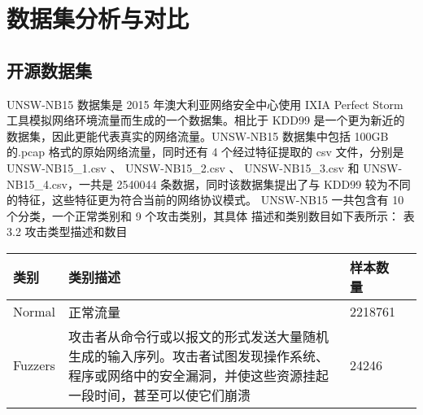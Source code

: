 \chapter{数据集分析与对比}
\section{开源数据集}
UNSW-NB15 数据集是 2015 年澳大利亚网络安全中心使用 IXIA Perfect Storm
工具模拟网络环境流量而生成的一个数据集。相比于 KDD99 是一个更为新近的
数据集，因此更能代表真实的网络流量。UNSW-NB15 数据集中包括 100GB
的.pcap 格式的原始网络流量，同时还有 4 个经过特征提取的 csv 文件，分别是
UNSW-NB15\_1.csv  、 UNSW-NB15\_2.csv 、 UNSW-NB15\_3.csv  和   UNSW-
NB15\_4.csv，一共是 2540044 条数据，同时该数据集提出了与 KDD99 较为不同
的特征，这些特征更为符合当前的网络协议模式。 
UNSW-NB15 一共包含有 10 个分类，一个正常类别和 9 个攻击类别，其具体
描述和类别数目如下表所示： 
表 3.2 攻击类型描述和数目 

\begin{table}[]
    \begin{tabular}{lp{3cm}p{3cm}p{3cm}}
    \toprule
    类别      & 类别描述                                                                       & 样本数量    \\ \midrule
    Normal  & 正常流量                                                                       & 2218761 \\
    Fuzzers & 攻击者从命令行或以报文的形式发送大量随机生成的输入序列。攻击者试图发现操作系统、程序或网络中的安全漏洞，并使这些资源挂起一段时间，甚至可以使它们崩溃 & 24246   \\ \bottomrule
    \end{tabular}
    \end{table}


